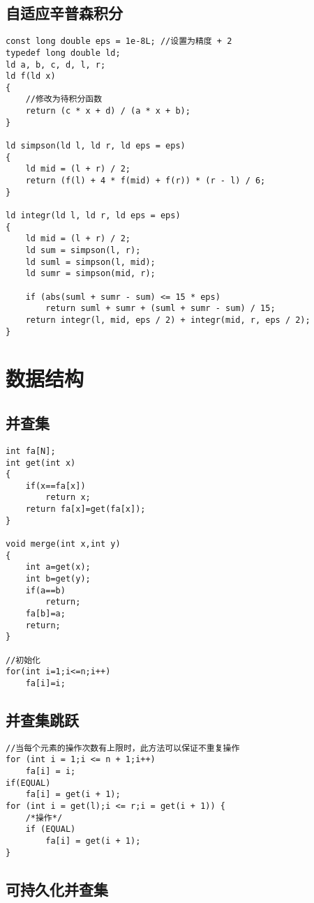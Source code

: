 \documentclass[twocolumn,a4]{article}
\begin{document}
\subsection{自适应辛普森积分}
\begin{lstlisting}
const long double eps = 1e-8L; //设置为精度 + 2
typedef long double ld;
ld a, b, c, d, l, r;
ld f(ld x)
{
    //修改为待积分函数
    return (c * x + d) / (a * x + b);
}

ld simpson(ld l, ld r, ld eps = eps)
{
    ld mid = (l + r) / 2;
    return (f(l) + 4 * f(mid) + f(r)) * (r - l) / 6;
}

ld integr(ld l, ld r, ld eps = eps)
{
    ld mid = (l + r) / 2;
    ld sum = simpson(l, r);
    ld suml = simpson(l, mid);
    ld sumr = simpson(mid, r);

    if (abs(suml + sumr - sum) <= 15 * eps)
        return suml + sumr + (suml + sumr - sum) / 15;
    return integr(l, mid, eps / 2) + integr(mid, r, eps / 2);
}
\end{lstlisting}

\section{数据结构}

\subsection{并查集}
\begin{lstlisting}
int fa[N];
int get(int x)
{
    if(x==fa[x])
        return x;
    return fa[x]=get(fa[x]);
}

void merge(int x,int y)
{
    int a=get(x);
    int b=get(y);
    if(a==b)
        return;
    fa[b]=a;
    return;
}

//初始化
for(int i=1;i<=n;i++)
    fa[i]=i;
\end{lstlisting}

\subsection{并查集跳跃}
\begin{lstlisting}
//当每个元素的操作次数有上限时，此方法可以保证不重复操作
for (int i = 1;i <= n + 1;i++)
    fa[i] = i;
if(EQUAL)
    fa[i] = get(i + 1);
for (int i = get(l);i <= r;i = get(i + 1)) {
    /*操作*/
    if (EQUAL)
        fa[i] = get(i + 1);
}
\end{lstlisting}

\subsection{可持久化并查集}
\begin{lstlisting}

\end{lstlisting}
\end{document}
